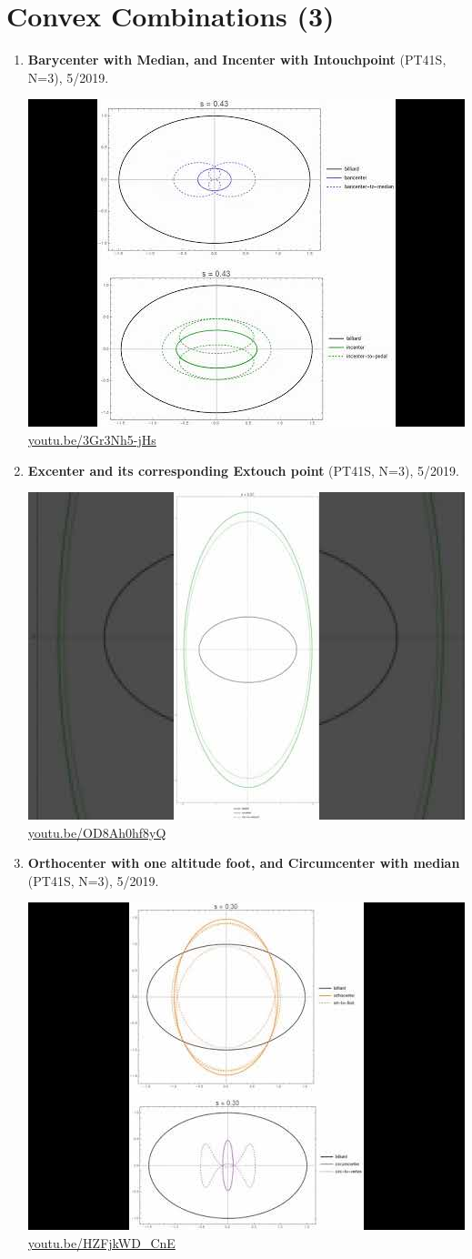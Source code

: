 \documentclass[12pt]{amsart}
\begin{document}
\section{Convex Combinations (3)}

\begin{enumerate}[resume]
\item \textbf{Barycenter with Median, and Incenter with Intouchpoint} (PT41S, N=3), 5/2019. 
\begin{center}\includegraphics[width=.5\textwidth]{pics/3Gr3Nh5-jHs.jpg} \\ 
\href{https://youtu.be/3Gr3Nh5-jHs}{\url{youtu.be/3Gr3Nh5-jHs}}\end{center}
% 
\item \textbf{Excenter and its corresponding Extouch point} (PT41S, N=3), 5/2019. 
\begin{center}\includegraphics[width=.5\textwidth]{pics/OD8Ah0hf8yQ.jpg} \\ 
\href{https://youtu.be/OD8Ah0hf8yQ}{\url{youtu.be/OD8Ah0hf8yQ}}\end{center}
% 
\item \textbf{Orthocenter with one altitude foot, and Circumcenter with median} (PT41S, N=3), 5/2019. 
\begin{center}\includegraphics[width=.5\textwidth]{pics/HZFjkWD_CnE.jpg} \\ 
\href{https://youtu.be/HZFjkWD_CnE}{\url{youtu.be/HZFjkWD\_CnE}}\end{center}
% 
\end{enumerate}
\end{document}
